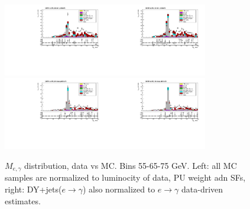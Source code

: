 \begin{figure}[htb]
\begin{center}
    \includegraphics[width=0.40\textwidth]{../figs/figs_v11/ELECTRON_WGamma/PrepareYields/c_TotalDATAvsMC_Barrel__Mpholep1PRELIMINARY_FOR_E_TO_GAMMA_WITH_PSV_CUT_pt65to75_.pdf}\includegraphics[width=0.40\textwidth]{../figs/figs_v11/ELECTRON_WGamma/PrepareYields/c_TotalDATAvsMC_Barrel__Mpholep1PRELIMINARY_FOR_E_TO_GAMMA_WITH_PSV_CUT_pt65to75__etogScale.pdf}\\
    \includegraphics[width=0.40\textwidth]{../figs/figs_v11/ELECTRON_WGamma/PrepareYields/c_TotalDATAvsMC_Endcap__Mpholep1PRELIMINARY_FOR_E_TO_GAMMA_WITH_PSV_CUT_pt65to75_.pdf}\includegraphics[width=0.40\textwidth]{../figs/figs_v11/ELECTRON_WGamma/PrepareYields/c_TotalDATAvsMC_Endcap__Mpholep1PRELIMINARY_FOR_E_TO_GAMMA_WITH_PSV_CUT_pt65to75__etogScale.pdf}\\
   \label{fig:Mpholep1DatavsMC_35to75}
  \caption{$M_{e,\gamma}$ distribution, data vs MC. Bins 55-65-75 GeV. Left: all MC samples are normalized to luminocity of data, PU weight adn SFs, right: DY+jets($e\rightarrow\gamma$) also normalized to $e\rightarrow\gamma$ data-driven estimates.}
  \end{center}
\end{figure}

